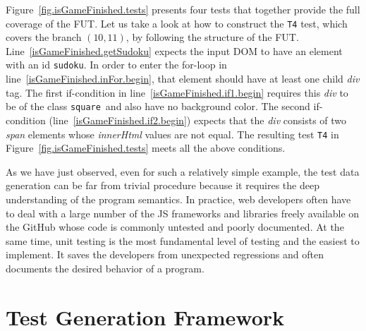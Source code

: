 \documentclass[sigconf,review]{acmart}
\begin{document}

Figure~\ref{fig.isGameFinished.tests} presents four tests that together provide the full coverage of the FUT. Let us take a look at how to construct the \texttt{T4} test, which covers the branch $(10,11)$, by following the structure of the FUT. Line~\ref{isGameFinished.getSudoku} expects the input DOM to have an element with an id \textquotesingle\texttt{sudoku}\textquotesingle. In order to enter the for-loop in line~\ref{isGameFinished.inFor.begin}, that element should have at least one child \emph{div} tag. The first if-condition in line~\ref{isGameFinished.if1.begin} requires this \emph{div} to be of the class \textquotesingle\texttt{square}\textquotesingle\ and also have no background color. The second if-condition (line~\ref{isGameFinished.if2.begin}) expects that the \emph{div} consists of two \emph{span} elements whose \emph{innerHtml} values are not equal. The resulting test \texttt{T4} in Figure~\ref{fig.isGameFinished.tests} meets all the above conditions. 

As we have just observed, even for such a relatively simple example, the test data generation can be far from trivial procedure because it requires the deep understanding of the program semantics. In practice, web developers often have to deal with a large number of the JS frameworks and libraries freely available on the GitHub whose code is commonly untested and poorly documented. At the same time, unit testing is the most fundamental level of testing and the easiest to implement. It saves the developers from unexpected regressions and often documents the desired behavior of a program.

\section{Test Generation Framework}
\label{sec.framework}
\end{document}
